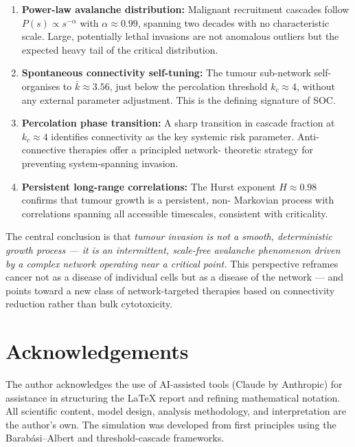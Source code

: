\documentclass[12pt,a4paper]{article}
\begin{document}
\begin{enumerate}[leftmargin=1.5em]
  \item \textbf{Power-law avalanche distribution:} Malignant recruitment
        cascades follow $P(s) \propto s^{-\alpha}$ with $\alpha \approx 0.99$,
        spanning two decades with no characteristic scale.  Large, potentially
        lethal invasions are not anomalous outliers but the expected heavy tail
        of the critical distribution.

  \item \textbf{Spontaneous connectivity self-tuning:} The tumour sub-network
        self-organises to $\bar{k} \approx 3.56$, just below the percolation
        threshold $k_c \approx 4$, without any external parameter adjustment.
        This is the defining signature of SOC.

  \item \textbf{Percolation phase transition:} A sharp transition in cascade
        fraction at $k_c \approx 4$ identifies connectivity as the key systemic
        risk parameter.  Anti-connective therapies offer a principled network-
        theoretic strategy for preventing system-spanning invasion.

  \item \textbf{Persistent long-range correlations:} The Hurst exponent
        $H \approx 0.98$ confirms that tumour growth is a persistent, non-
        Markovian process with correlations spanning all accessible timescales,
        consistent with criticality.
\end{enumerate}

The central conclusion is that \emph{tumour invasion is not a smooth,
deterministic growth process --- it is an intermittent, scale-free avalanche
phenomenon driven by a complex network operating near a critical point.}
This perspective reframes cancer not as a disease of individual cells but as a
disease of the network --- and points toward a new class of network-targeted
therapies based on connectivity reduction rather than bulk cytotoxicity.

\section*{Acknowledgements}

The author acknowledges the use of AI-assisted tools (Claude by Anthropic) for
assistance in structuring the LaTeX report and refining mathematical notation.
All scientific content, model design, analysis methodology, and interpretation
are the author's own.  The simulation was developed from first principles using
the Barab\'{a}si--Albert and threshold-cascade frameworks.
\end{document}

